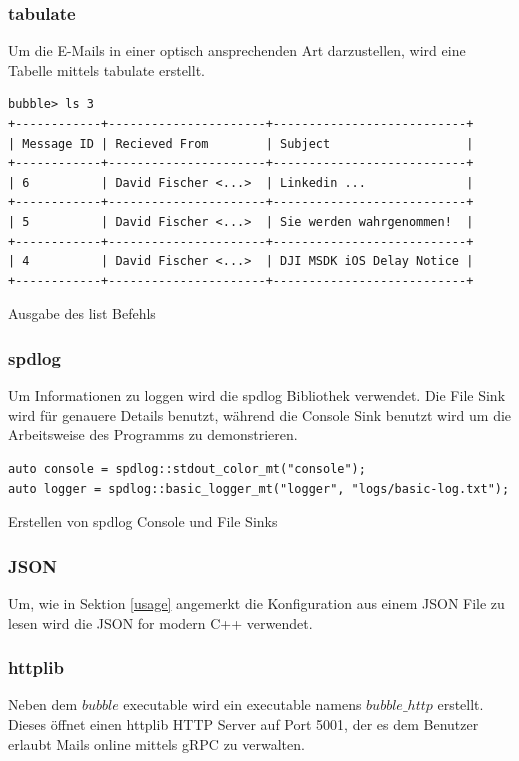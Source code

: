 \documentclass[12pt, letterpaper]{article}
\newenvironment{code}{\captionsetup{type=listing}}{}
\begin{document}
\subsubsection{tabulate}
Um die E-Mails in einer optisch ansprechenden Art darzustellen, wird eine Tabelle mittels tabulate\cite{tabulate_ref} erstellt.

\begin{code}
  \begin{verbatim}
bubble> ls 3
+------------+----------------------+---------------------------+
| Message ID | Recieved From        | Subject                   | 
+------------+----------------------+---------------------------+
| 6          | David Fischer <...>  | Linkedin ...              | 
+------------+----------------------+---------------------------+
| 5          | David Fischer <...>  | Sie werden wahrgenommen!  |
+------------+----------------------+---------------------------+
| 4          | David Fischer <...>  | DJI MSDK iOS Delay Notice |
+------------+----------------------+---------------------------+
  \end{verbatim}
  \caption{Ausgabe des list Befehls}
\end{code}

\subsubsection{spdlog}
Um Informationen zu loggen wird die spdlog\cite{spdlog_ref} Bibliothek verwendet. Die File Sink wird für genauere Details benutzt, während die Console Sink benutzt wird um die Arbeitsweise des Programms zu demonstrieren.

\begin{code}
\begin{verbatim}
auto console = spdlog::stdout_color_mt("console");
auto logger = spdlog::basic_logger_mt("logger", "logs/basic-log.txt");
\end{verbatim}
\caption{Erstellen von spdlog Console und File Sinks}
\label{create_gnutls}
\end{code}

\subsubsection{JSON}
Um, wie in Sektion \ref{usage} angemerkt die Konfiguration aus einem JSON File zu lesen wird die JSON for modern C++\cite{json_ref} verwendet.

\subsubsection{httplib}
Neben dem $bubble$ executable wird ein executable namens $bubble\_http$ erstellt. Dieses öffnet einen httplib\cite{httplib-ref} HTTP Server auf Port 5001, der es dem Benutzer erlaubt Mails online mittels gRPC zu verwalten.
\end{document}
